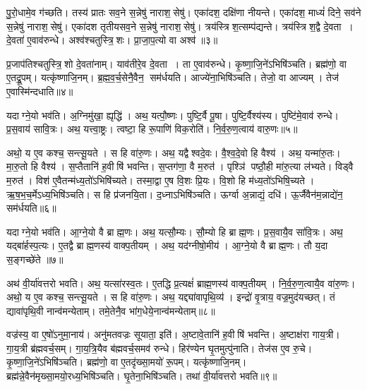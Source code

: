 पु॒रो॒धामे॒व ग॑च्छति।
तस्य॑ प्रातः सव॒ने स॒न्नेषु॑ नाराश॒सेषु॑।
एका॑दश॒ दक्षि॑णा नीयन्ते।
एका॑दश॒ माध्यं॑ दिने॒ सव॑ने स॒न्नेषु॑ नाराश॒सेषु॑।
एका॑दश तृतीयसव॒ने स॒न्नेषु॑ नाराश॒सेषु॑।
त्रय॑स्त्रिश॒त्सम्प॑द्यन्ते।
त्रय॑स्त्रिश॒द्वै दे॒वता।
दे॒वता॑ ए॒वाव॑रुन्धे।
अश्व॑श्चतुस्त्रि॒शः।
प्रा॒जा॒प॒त्यो वा अश्व॑॥३॥

प्र॒जाप॑तिश्चतुस्त्रि॒शो दे॒वता॑नाम्।
याव॑तीरे॒व दे॒वता।
ता ए॒वाव॑रुन्धे।
कृ॒ष्णा॒जि॒ने॑ऽभिषि॑ञ्चति।
ब्रह्म॑णो॒ वा ए॒तद्रू॒पम्।
यत्कृ॑ष्णाजि॒नम्।
ब्र॒ह्म॒व॒र्च॒सेनै॒वैन॒ सम॑र्धयति।
आज्ये॑ना॒भिषि॑ञ्चति।
तेजो॒ वा आज्यम्।
तेज॑ ए॒वास्मि॑न्दधाति॥४॥\anuvakamend[होता॑ भवति यजेत॒ वा अश्वो॑ दधाति]

यदाग्ने॒यो भव॑ति।
अ॒ग्निमु॑खा॒ ह्यृद्धि॑।
अथ॒ यत्पौ॒ष्णः।
पुष्टि॒र्वै पू॒षा।
पुष्टि॒र्वैश्य॑स्य।
पुष्टि॑मे॒वाव॑ रुन्धे।
प्र॒स॒वाय॑ सावि॒त्रः।
अथ॒ यत्त्वा॒ष्ट्रः।
त्वष्टा॒ हि रू॒पाणि॑ विक॒रोति॑।
नि॒र्व॒रु॒ण॒त्वाय॑ वारु॒णः॥५॥

अथो॒ य ए॒व कश्च॒ सन्त्सू॒यते।
स हि वा॑रु॒णः।
अथ॒ यद्वैश्वदे॒वः।
वै॒श्व॒दे॒वो हि वैश्य॑।
अथ॒ यन्मा॑रु॒तः।
मा॒रु॒तो हि वैश्य॑।
स॒प्तैतानि॑ ह॒वीषि॑ भवन्ति।
स॒प्तग॑णा॒ वै म॒रुत॑।
पृश्ञि॑ पष्ठौ॒ही मा॑रु॒त्या ल॑भ्यते।
विड्वै म॒रुत॑।
विश॑ ए॒वैतन्म॑ध्य॒तो॑ऽभिषि॑च्यते।
तस्मा॒द्वा ए॒ष वि॒शः प्रि॒यः।
वि॒शो हि म॑ध्य॒तो॑ऽभिषि॒च्यते।
ऋ॒ष॒भ॒च॒र्मेऽध्य॒भिषि॑ञ्चति।
स हि प्र॑जनयि॒ता।
द॒ध्नाऽभिषि॑ञ्चति।
ऊर्ग्वा अ॒न्नाद्यं॒ दधि॑।
ऊ॒र्जैवैन॑म॒न्नाद्ये॑न॒ सम॑र्धयति॥६॥\anuvakamend[वा॒रु॒णो विड्वै म॒रुतो॒ऽष्टौ च॑]

यदाग्ने॒यो भव॑ति।
आ॒ग्ने॒यो वै ब्राह्म॒णः।
अथ॒ यत्सौ॒म्यः।
सौ॒म्यो हि ब्राह्म॒णः।
प्र॒स॒वायै॒व सा॑वि॒त्रः।
अथ॒ यद्बा॑र्\mbox{}हस्प॒त्यः।
ए॒तद्वै ब्राह्म॒णस्य॑ वाक्प॒तीयम्।
अथ॒ यद॑ग्नीषो॒मीय॑।
आ॒ग्ने॒यो वै ब्राह्म॒णः।
तौ य॒दा स॒ङ्गच्छे॑ते ॥७॥

अथ॑ वी॒र्या॑वत्तरो भवति।
अथ॒ यत्सा॑रस्व॒तः।
ए॒तद्धि प्र॒त्यक्षं॑ ब्राह्म॒णस्य॑ वाक्प॒तीयम्।
नि॒र्व॒रु॒ण॒त्वायै॒व वा॑रु॒णः।
अथो॒ य ए॒व कश्च॒ सन्त्सू॒यते।
स हि वा॑रु॒णः।
अथ॒ यद्द्या॑वापृथि॒व्य॑।
इन्द्रो॑ वृ॒त्राय॒ वज्र॒मुद॑यच्छत्।
तं द्यावा॑पृथि॒वी नान्व॑मन्येताम्।
तमे॒तेनै॒व भा॑ग॒धेये॒नान्व॑मन्येताम्॥८॥

वज्र॑स्य॒ वा ए॒षो॑ऽनुमा॒नाय॑।
अनु॑मतवज्रः सूयाता॒ इति॑।
अ॒ष्टावे॒तानि॑ ह॒वीषि॑ भवन्ति।
अ॒ष्टाक्ष॑रा गाय॒त्री।
गा॒य॒त्री ब्र॑ह्मवर्च॒सम्।
गा॒य॒त्रि॒यैव ब॑ह्मवर्च॒समव॑ रुन्धे।
हिर॑ण्येन घृ॒तमुत्पु॑नाति।
तेज॑स ए॒व रु॒चे।
कृ॒ष्णा॒जि॒ने॑ऽभिषि॑ञ्चति।
ब्रह्म॑णो॒ वा ए॒तदृ॑ख्सा॒मयो॑ रू॒पम्।
यत्कृ॑ष्णाजि॒नम्।
ब्रह्म॑न्ने॒वैन॑मृख्सा॒मयो॒रध्य॒भिषि॑ञ्चति।
घृ॒तेना॒भिषि॑ञ्चति।
तथा॑ वी॒र्या॑वत्तरो भवति॥९॥\anuvakamend[स॒ङ्गच्छे॑ते भाग॒धेये॒नान्व॑मन्येता रू॒पञ्च॒त्वारि॑ च]

